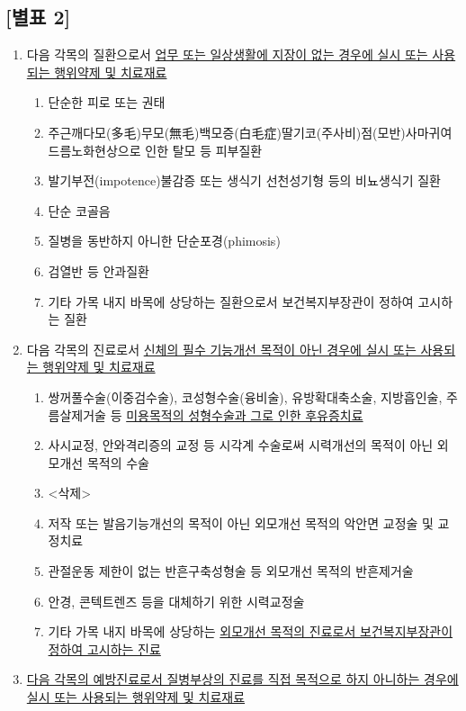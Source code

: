 \subsection{[별표 2]}
\begin{enumerate}[1.]\tightlist
\item 다음 각목의 질환으로서 \uline{업무 또는 일상생활에 지장이 없는 경우에 실시 또는 사용되는 행위\cntrdot{}약제 및 치료재료}
	\begin{enumerate}[가.]\tightlist
	\item 단순한 피로 또는 권태
	\item 주근깨\cntrdot{}다모(多毛)\cntrdot{}무모(無毛)\cntrdot{}백모증(白毛症)\cntrdot{}딸기코(주사비)\cntrdot{}점(모반)\cntrdot{}사마귀\cntrdot{}여드름\cntrdot{}노화현상으로 인한 탈모 등 피부질환
	\item 발기부전(impotence)\cntrdot{}불감증 또는 생식기 선천성기형 등의 비뇨생식기 질환
	\item 단순 코골음
	\item 질병을 동반하지 아니한 단순포경(phimosis)
	\item 검열반 등 안과질환
	\item 기타 가목 내지 바목에 상당하는 질환으로서 보건복지부장관이 정하여 고시하는 질환
	\end{enumerate}
\item 다음 각목의 진료로서 \uline{신체의 필수 기능개선 목적이 아닌 경우에 실시 또는 사용되는 행위\cntrdot{}약제 및 치료재료}
	\begin{enumerate}[가.]\tightlist
	\item 쌍꺼풀수술(이중검수술), 코성형수술(융비술), 유방확대\cntrdot{}축소술, 지방흡인술, 주름살제거술 등 \uline{미용목적의 성형수술과 그로 인한 후유증치료}
	\item 사시교정, 안와격리증의 교정 등 시각계 수술로써 시력개선의 목적이 아닌 외모개선 목적의 수술
	\item <삭제>
	\item 저작 또는 발음기능개선의 목적이 아닌 외모개선 목적의 악안면 교정술 및 교정치료
	\item 관절운동 제한이 없는 반흔구축성형술 등 외모개선 목적의 반흔제거술
	\item 안경, 콘텍트렌즈 등을 대체하기 위한 시력교정술
	\item 기타 가목 내지 바목에 상당하는 \uline{외모개선 목적의 진료로서 보건복지부장관이 정하여 고시하는 진료}
	\end{enumerate}
\item \uline{다음 각목의 예방진료로서 질병\cntrdot{}부상의 진료를 직접 목적으로 하지 아니하는 경우에 실시 또는 사용되는 행위\cntrdot{}약제 및 치료재료}

\end{enumerate}
